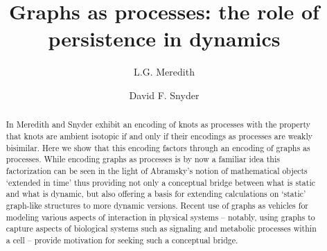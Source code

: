\documentclass[]{llncs}
\begin{document}
\title{Graphs as processes: the role of persistence in dynamics}

\author{ L.G. Meredith \and David F. Snyder }

\maketitle              %


\begin{abstract}
  
  In \cite{} Meredith and Snyder exhibit an encoding of knots as
  processes with the property that knots are ambient isotopic if and
  only if their encodings as processes are weakly bisimilar. Here we
  show that this encoding factors through an encoding of graphs as
  processes. While encoding graphs as processes is by now a familiar
  idea this factorization can be seen in the light of Abramsky's
  notion of mathematical objects `extended in time' thus providing not
  only a conceptual bridge between what is static and what is dynamic,
  but also offering a basis for extending calculations on `static'
  graph-like structures to more dynamic versions. Recent use of graphs
  as vehicles for modeling various aspects of interaction in physical
  systems -- notably, using graphs to capture aspects of
  biological systems such as signaling and metabolic processes within
  a cell -- provide motivation for seeking such a conceptual bridge.

\end{abstract}

\end{document}
